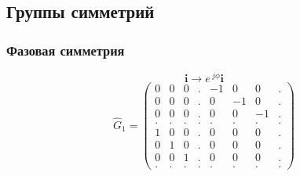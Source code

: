 \subsection{Группы симметрий}

\begin{frame}
    \frametitle{Фазовая симметрия}
    $$\textbf{i} \to e^{~{j}\phi}\textbf{i}$$
    \vspace{2em}
    $$
    \hat{G}_1 =
    \left(
    \begin{array}{cccccccc}
      0 & 0 & 0 & . & -1 & 0 & 0 & . \\
      0 & 0 & 0 & . & 0 & -1 & 0 & . \\
      0 & 0 & 0 & . & 0 & 0 & -1 & . \\
      . & . & . & . & . & . & . & . \\
      1 & 0 & 0 & . & 0 & 0 & 0 & . \\
      0 & 1 & 0 & . & 0 & 0 & 0 & . \\
      0 & 0 & 1 & . & 0 & 0 & 0 & . \\
      . & . & . & . & . & . & . & .
    \end{array}
    \right)
    $$
\end{frame}




